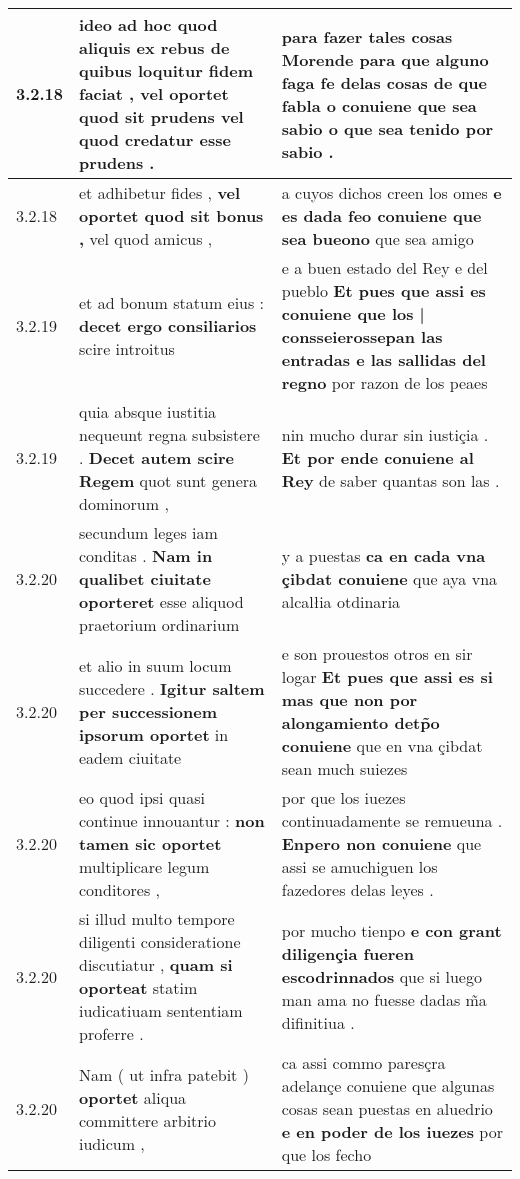\begin{tabular}{|p{1cm}|p{6.5cm}|p{6.5cm}|}
3.2.18 & ideo ad hoc quod aliquis ex rebus \textbf{ de quibus loquitur fidem faciat , vel oportet quod sit prudens } vel quod credatur esse prudens . & para fazer tales cosas \textbf{ Morende para que alguno faga fe delas cosas de que fabla o conuiene que sea sabio } o que sea tenido por sabio . \\\hline
3.2.18 & et adhibetur fides , \textbf{ vel oportet quod sit bonus , } vel quod amicus , & a cuyos dichos creen los omes \textbf{ e es dada feo conuiene que sea bueono } que sea amigo \\\hline
3.2.19 & et ad bonum statum eius : \textbf{ decet ergo consiliarios } scire introitus & e a buen estado del Rey e del pueblo \textbf{ Et pues que assi es conuiene que los | consseierossepan las entradas e las sallidas del regno } por razon de los peaes \\\hline
3.2.19 & quia absque iustitia nequeunt regna subsistere . \textbf{ Decet autem scire Regem } quot sunt genera dominorum , & nin mucho durar sin iustiçia . \textbf{ Et por ende conuiene al Rey } de saber quantas son las . \\\hline
3.2.20 & secundum leges iam conditas . \textbf{ Nam in qualibet ciuitate oporteret } esse aliquod praetorium ordinarium & y a puestas \textbf{ ca en cada vna çibdat conuiene } que aya vna alcalłia otdinaria \\\hline
3.2.20 & et alio in suum locum succedere . \textbf{ Igitur saltem per successionem ipsorum oportet } in eadem ciuitate & e son prouestos otros en sir logar \textbf{ Et pues que assi es si mas que non por alongamiento detp̃o conuiene } que en vna çibdat sean much suiezes \\\hline
3.2.20 & eo quod ipsi quasi continue innouantur : \textbf{ non tamen sic oportet } multiplicare legum conditores , & por que los iuezes continuadamente se remueuna . \textbf{ Enpero non conuiene } que assi se amuchiguen los fazedores delas leyes . \\\hline
3.2.20 & si illud multo tempore diligenti consideratione discutiatur , \textbf{ quam si oporteat } statim iudicatiuam sententiam proferre . & por mucho tienpo \textbf{ e con grant diligençia fueren escodrinnados } que si luego man ama no fuesse dadas m̃a difinitiua . \\\hline
3.2.20 & Nam ( ut infra patebit ) \textbf{ oportet } aliqua committere arbitrio iudicum , & ca assi commo paresçra adelançe conuiene que algunas cosas sean puestas en aluedrio \textbf{ e en poder de los iuezes } por que los fecho \\\hline

\end{tabular}
